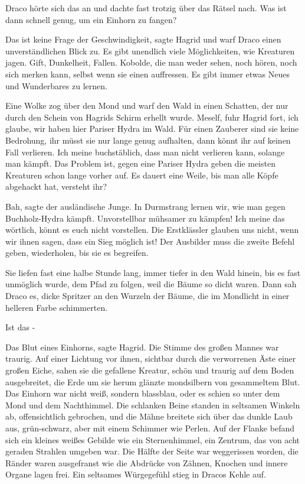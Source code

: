 Draco hörte sich das an und dachte fast trotzig über das Rätsel nach. \glqq{}Was
ist dann schnell genug, um ein Einhorn zu fangen?\grqq{}

\glqq{}Das ist keine Frage der Geschwindigkeit\grqq{}, sagte Hagrid und warf
Draco einen unverständlichen Blick zu. \glqq{}Es gibt unendlich viele
Möglichkeiten, wie Kreaturen jagen. Gift, Dunkelheit, Fallen. Kobolde,
die man weder sehen, noch hören, noch sich merken kann, selbst wenn sie
einen auffressen. Es gibt immer etwas Neues und Wunderbares zu
lernen.\grqq{}

Eine Wolke zog über den Mond und warf den Wald in einen Schatten, der nur durch
den Schein von Hagrids Schirm erhellt wurde. \glqq{}Meself\grqq{}, fuhr
Hagrid fort, \glqq{}ich glaube, wir haben hier Pariser Hydra im Wald. Für
einen Zauberer sind sie keine Bedrohung, ihr müsst sie nur lange genug
aufhalten, dann könnt ihr auf keinen Fall verlieren. Ich meine
buchstäblich, dass man nicht verlieren kann, solange man kämpft. Das
Problem ist, gegen eine Pariser Hydra geben die meisten Kreaturen schon
lange vorher auf. Es dauert eine Weile, bis man alle Köpfe abgehackt hat,
versteht ihr?\grqq{}

\glqq{}Bah\grqq{}, sagte der ausländische Junge. \glqq{}In Durmstrang lernen wir,
wie man gegen Buchholz-Hydra kämpft. Unvorstellbar mühsamer zu kämpfen!
Ich meine das wörtlich, könnt es euch nicht vorstellen. Die Erstklässler
glauben uns nicht, wenn wir ihnen sagen, dass ein Sieg möglich ist! Der
Ausbilder muss die zweite Befehl geben, wiederholen, bis sie es
begreifen.\grqq{}

Sie liefen fast eine halbe Stunde lang, immer tiefer in den Wald hinein, bis es
fast unmöglich wurde, dem Pfad zu folgen, weil die Bäume so dicht waren.
Dann sah Draco es, dicke Spritzer an den Wurzeln der Bäume, die im
Mondlicht in einer helleren Farbe schimmerten.

\glqq{}Ist das -\grqq{}

\glqq{}Das Blut eines Einhorns\grqq{}, sagte Hagrid. Die Stimme des großen Mannes
war traurig. Auf einer Lichtung vor ihnen, sichtbar durch die verworrenen
Äste einer großen Eiche, sahen sie die gefallene Kreatur, schön und
traurig auf dem Boden ausgebreitet, die Erde um sie herum glänzte
mondsilbern von gesammeltem Blut. Das Einhorn war nicht weiß, sondern
blassblau, oder es schien so unter dem Mond und dem Nachthimmel. Die
schlanken Beine standen in seltsamen Winkeln ab, offensichtlich
gebrochen, und die Mähne breitete sich über das dunkle Laub aus,
grün-schwarz, aber mit einem Schimmer wie Perlen. Auf der Flanke befand
sich ein kleines weißes Gebilde wie ein Sternenhimmel, ein Zentrum, das
von acht geraden Strahlen umgeben war. Die Hälfte der Seite war
weggerissen worden, die Ränder waren ausgefranst wie die Abdrücke von
Zähnen, Knochen und innere Organe lagen frei. Ein seltsames Würgegefühl
stieg in Dracos Kehle auf.

